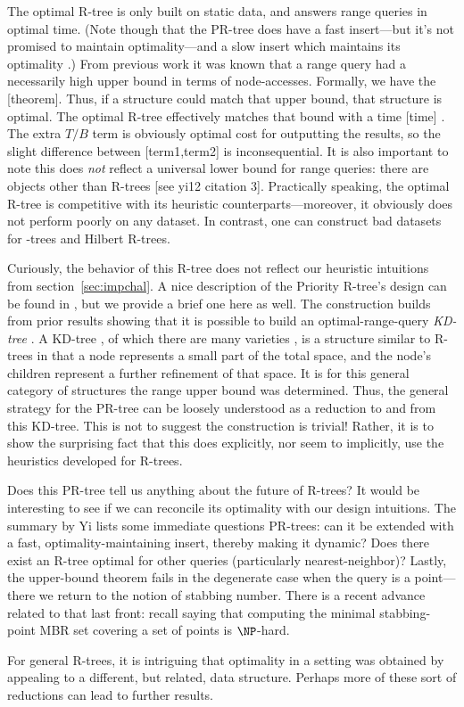 The optimal R-tree is only built on static data, and answers range queries in optimal time.
(Note though that the PR-tree does have a fast insert---but it's not promised to maintain optimality---and a slow insert which maintains its optimality \cite{argeberghaverkortyi04}.)
From previous work \cite{kanthsing99} it was known that a range query had a necessarily high upper bound in terms of node-accesses.
Formally, we have the [theorem].
Thus, if a structure could match that upper bound, that structure is optimal.
The optimal R-tree effectively matches that bound with a time [time] \cite{yi12}.
The extra $T/B$ term is obviously optimal cost for outputting the results, so the slight difference between [term1,term2] is inconsequential.
It is also important to note this does \emph{not} reflect a universal lower bound for range queries: there are objects other than R-trees [see yi12 citation 3].
Practically speaking, the optimal R-tree is competitive with its heuristic counterparts---moreover, it obviously does not perform poorly on any dataset.
In contrast, one can construct bad datasets for \rstar-trees and Hilbert R-trees.

Curiously, the behavior of this R-tree does not reflect our heuristic intuitions from section~\ref{sec:impchal}.
A nice description of the Priority R-tree's design can be found in \cite{thebook}, but we provide a brief one here as well.
The construction builds from prior results showing that it is possible to build an optimal-range-query \emph{KD-tree} \cite{agarwalberggudmundssonhammarhaverkort01}.
A KD-tree \cite{bentley75}, of which there are many varieties \cite{gaedegunther98}, is a structure similar to R-trees in that a node represents a small part of the total space, and the node's children represent a further refinement of that space.
It is for this general category of structures the range upper bound was determined.
Thus, the general strategy for the PR-tree can be loosely understood as a reduction to and from this KD-tree.
This is not to suggest the construction is trivial! Rather, it is to show the surprising fact that this does explicitly, nor seem to implicitly, use the heuristics developed for R-trees.

Does this PR-tree tell us anything about the future of R-trees?
It would be interesting to see if we can reconcile its optimality with our design intuitions.
The summary by Yi \cite{yi12} lists some immediate questions PR-trees: can it be extended with a fast, optimality-maintaining insert, thereby making it dynamic?
Does there exist an R-tree optimal for other queries (particularly nearest-neighbor)?
Lastly, the upper-bound theorem fails in the degenerate case when the query is a point---there we return to the notion of stabbing number.
There is a recent advance related to that last front: recall \cite{bergkhosraviverdonschotweele11} saying that computing the minimal stabbing-point MBR set covering a set of points is $\NP$-hard.

For general R-trees, it is intriguing that optimality in a setting was obtained by appealing to a different, but related, data structure.
Perhaps more of these sort of reductions can lead to further results.

